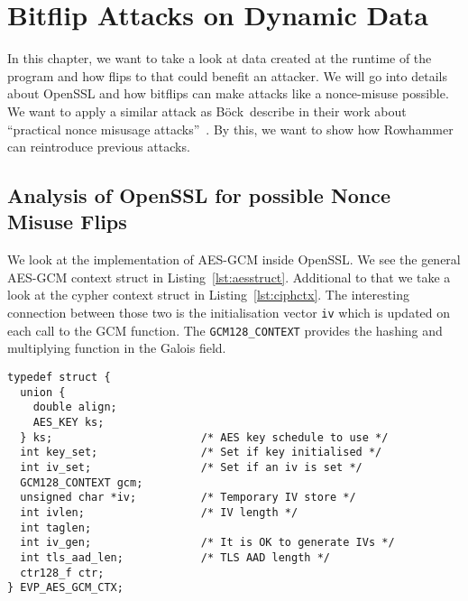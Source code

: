 \chapter{Bitflip Attacks on Dynamic Data}\label{sec:dynattack}

In this chapter, we want to take a look at data created at the runtime of the
program and how flips to that could benefit an attacker. We will go into details
about OpenSSL and how bitflips can make attacks like a nonce-misuse possible. We
want to apply a similar attack as Böck~\etal describe in their work about ``practical nonce misusage
attacks''~\cite{gcmnonceattack}. By this, we want to show how
Rowhammer can reintroduce previous attacks.

\section{Analysis of OpenSSL for possible Nonce Misuse Flips}

We look at the implementation of AES-GCM inside OpenSSL. We see the general
AES-GCM context struct in Listing~\ref{lst:aesstruct}. Additional to that we
take a look at the cypher context struct in Listing~\ref{lst:ciphctx}. The
interesting connection between those two is the initialisation vector
\texttt{iv} which is updated on each call to the GCM function. The
\texttt{GCM128\_CONTEXT} provides the hashing and multiplying function in the
Galois field.

\begin{minipage}{\linewidth}
\begin{lstlisting}[style=CStyle,
                   caption={Struct used by OpenSSL to describe the AES-GCM
context. The IV used is stored in the memory pointed to by \texttt{iv}. Source
is taken from OpenSSL version $1.1.0g$},
                   label={lst:aesstruct}]
typedef struct {
  union {
    double align;
    AES_KEY ks;
  } ks;                       /* AES key schedule to use */
  int key_set;                /* Set if key initialised */
  int iv_set;                 /* Set if an iv is set */
  GCM128_CONTEXT gcm;
  unsigned char *iv;          /* Temporary IV store */
  int ivlen;                  /* IV length */
  int taglen;
  int iv_gen;                 /* It is OK to generate IVs */
  int tls_aad_len;            /* TLS AAD length */
  ctr128_f ctr;
} EVP_AES_GCM_CTX;
\end{lstlisting}
\end{minipage}

